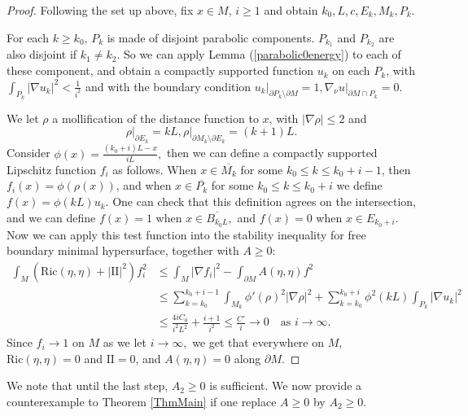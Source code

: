 \documentclass[12pt]{amsart}
\newcommand{\sff}{\mathrm{I\!I}}
\newcommand{\Ric}{\text{Ric}}
\newcommand{\p}{\partial}
\numberwithin{equation}{section}
\begin{document}
	\begin{proof}
		Following the set up above, fix $x \in M$, $i \geq 1$ and obtain $k_0, L,c, E_k, M_k, P_k$.

		For each $k \geq k_0$, $P_k$ is made of disjoint parabolic components. $P_{k_1}$ and $P_{k_2}$ are also disjoint if $k_1 \neq k_2$. So we can apply Lemma (\ref{parabolic0energy}) to each of these component, and obtain a compactly supported function $u_k$ on each $P_k$, with $\int_{P_k} |\nabla u_{k}|^2 < \frac{1}{i^2}$ and with the boundary condition $u_k \vert_{\partial P_k \setminus \partial M}=1, \nabla_{\nu}u\vert_{\partial M \cap P_k}=0$.


		We let $\rho$ a mollification of the distance function to $x$, with $|\nabla \rho|\leq 2$ and
		\begin{equation*}
			\rho\vert_{\partial E_k} = kL, \rho \vert_{\partial M_k \setminus \partial E_k}=(k+1)L.
		\end{equation*}
		Consider $\phi(x)=\frac{(k_0+i)L-x}{iL},$ then we can define a compactly supported Lipschitz function $f_i$ as follows. When $x\in \overline{M_k}$ for some $k_0 \leq k \leq k_0+i-1$, then $f_i(x)= \phi(\rho(x))$, and when $x\in \overline{P_k}$ for some $k_0 \leq k \leq k_0+i$ we define $f(x)=\phi(kL)u_k.$ One can check that this definition agrees on the intersection, and we can define $f(x)=1$ when $x\in \overline{B_{k_0L}},$ and $f(x)=0$ when $x \in E_{k_0+i}.$ Now we can apply this test function into the stability inequality for free boundary minimal hypersurface, together with $A\geq 0$:
		\begin{align*}
			\int_M (\Ric(\eta,\eta)+|\sff|^2)f_i^2&\leq \int_M |\nabla f_i|^2-\int_{\partial M} A(\eta,\eta)f^2\\
			&\leq\sum_{k=k_0}^{k_0+i-1} \int_{M_k} \phi'(\rho)^2|\nabla \rho|^2+\sum_{k=k_0}^{k_0+i} \phi^2(kL) \int_{P_k} |\nabla u_k|^2  \\
			&\leq \frac{4iC_0}{i^2L^2}+ \frac{i+1}{i^2} \leq \frac{C'}{i} \rightarrow 0 \quad \text{as } i \rightarrow \infty.
		\end{align*}
		Since $f_i \rightarrow 1$ on $M$ as we let $i\rightarrow \infty,$ 
		we get that everywhere on $M$, $\Ric(\eta,\eta)=0$ and $\sff=0$, and $A(\eta,\eta)=0$ along $\p M$. 
	\end{proof}

	We note that until the last step, $A_2 \geq 0$ is sufficient. We now provide a counterexample to Theorem \ref{ThmMain} if one replace $A \geq 0$ by $A_2 \geq 0$.
\end{document}
